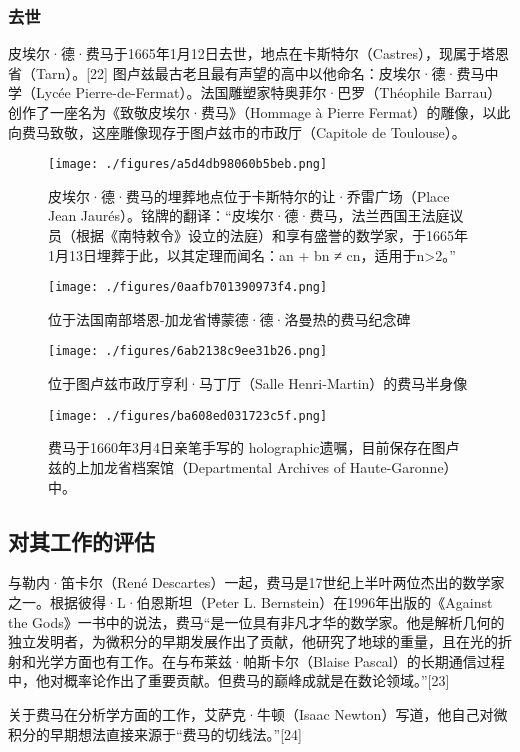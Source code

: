 \subsubsection{去世}  
皮埃尔·德·费马于1665年1月12日去世，地点在卡斯特尔（Castres），现属于塔恩省（Tarn）。[22] 图卢兹最古老且最有声望的高中以他命名：皮埃尔·德·费马中学（Lycée Pierre-de-Fermat）。法国雕塑家特奥菲尔·巴罗（Théophile Barrau）创作了一座名为《致敬皮埃尔·费马》（Hommage à Pierre Fermat）的雕像，以此向费马致敬，这座雕像现存于图卢兹市的市政厅（Capitole de Toulouse）。
\begin{figure}[ht]
\centering
\texttt{[image: ./figures/a5d4db98060b5beb.png]}
\caption{皮埃尔·德·费马的埋葬地点位于卡斯特尔的让·乔雷广场（Place Jean Jaurés）。铭牌的翻译：“皮埃尔·德·费马，法兰西国王法庭议员（根据《南特敕令》设立的法庭）和享有盛誉的数学家，于1665年1月13日埋葬于此，以其定理而闻名：an + bn ≠ cn，适用于n>2。”} \label{fig_Pierre_3}
\end{figure}
\begin{figure}[ht]
\centering
\texttt{[image: ./figures/0aafb701390973f4.png]}
\caption{位于法国南部塔恩-加龙省博蒙德·德·洛曼热的费马纪念碑} \label{fig_Pierre_4}
\end{figure}
\begin{figure}[ht]
\centering
\texttt{[image: ./figures/6ab2138c9ee31b26.png]}
\caption{位于图卢兹市政厅亨利·马丁厅（Salle Henri-Martin）的费马半身像} \label{fig_Pierre_5}
\end{figure}
\begin{figure}[ht]
\centering
\texttt{[image: ./figures/ba608ed031723c5f.png]}
\caption{费马于1660年3月4日亲笔手写的 holographic遗嘱，目前保存在图卢兹的上加龙省档案馆（Departmental Archives of Haute-Garonne）中。} \label{fig_Pierre_6}
\end{figure}
\subsection{对其工作的评估}  
与勒内·笛卡尔（René Descartes）一起，费马是17世纪上半叶两位杰出的数学家之一。根据彼得·L·伯恩斯坦（Peter L. Bernstein）在1996年出版的《Against the Gods》一书中的说法，费马“是一位具有非凡才华的数学家。他是解析几何的独立发明者，为微积分的早期发展作出了贡献，他研究了地球的重量，且在光的折射和光学方面也有工作。在与布莱兹·帕斯卡尔（Blaise Pascal）的长期通信过程中，他对概率论作出了重要贡献。但费马的巅峰成就是在数论领域。”[23]

关于费马在分析学方面的工作，艾萨克·牛顿（Isaac Newton）写道，他自己对微积分的早期想法直接来源于“费马的切线法。”[24]

